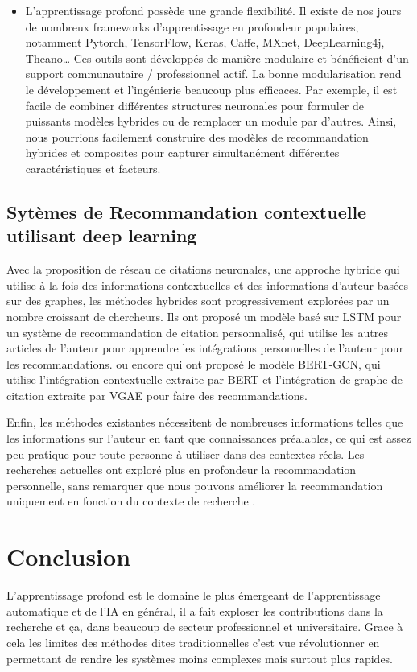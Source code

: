 \begin{itemize}[label=•]
        \item L'apprentissage profond possède une grande flexibilité. Il existe de nos jours de nombreux frameworks d'apprentissage en profondeur populaires, notamment Pytorch, TensorFlow, Keras, Caffe, MXnet, DeepLearning4j, Theano… Ces outils sont développés de manière modulaire et bénéficient d'un support communautaire / professionnel actif. La bonne modularisation rend le développement et l'ingénierie beaucoup plus efficaces. Par exemple, il est facile de combiner différentes structures neuronales pour formuler de puissants modèles hybrides ou de remplacer un module par d'autres. Ainsi, nous pourrions facilement construire des modèles de recommandation hybrides et composites pour capturer simultanément différentes caractéristiques et facteurs.
    
        \end{itemize}

    \subsection{Sytèmes de Recommandation contextuelle utilisant deep learning }
    \par Avec la proposition de réseau de citations neuronales\cite{ch2ref16}, une approche hybride qui utilise à la fois des informations contextuelles et des informations d'auteur basées sur des graphes, les méthodes hybrides sont progressivement explorées par un nombre croissant de chercheurs. Ils ont proposé un modèle basé sur LSTM pour un système de recommandation de citation personnalisé, qui utilise les autres articles de l'auteur pour apprendre les intégrations personnelles de l'auteur pour les recommandations. ou encore \cite{ch1ref8} qui ont proposé le modèle BERT-GCN, qui utilise l'intégration contextuelle extraite par BERT\cite{ch2bert} et l'intégration de graphe de citation extraite par VGAE pour faire des recommandations. 
    
    \par Enfin, les méthodes existantes nécessitent de nombreuses informations telles que les informations sur l'auteur en tant que connaissances préalables, ce qui est assez peu pratique pour toute personne à utiliser dans des contextes réels. Les recherches actuelles ont exploré plus en profondeur la recommandation personnelle, sans remarquer que nous pouvons améliorer la recommandation uniquement en fonction du contexte de recherche \cite{ch1ref8}.
    
    
\section{Conclusion}
\par L'apprentissage profond est le domaine le plus émergeant de l'apprentissage automatique et de l'IA en général, il a fait exploser les contributions dans la recherche et ça, dans beaucoup de secteur professionnel et universitaire. Grace à cela les limites des méthodes dites traditionnelles c'est vue révolutionner en permettant de rendre les systèmes moins complexes mais surtout plus rapides.


